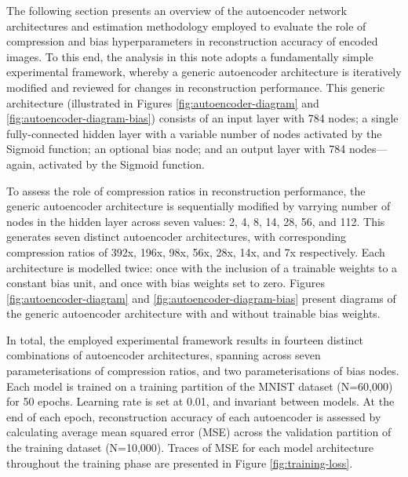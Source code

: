 
The following section presents an overview of the autoencoder network architectures and estimation methodology employed to evaluate the role of compression and bias hyperparameters in reconstruction accuracy of encoded images. 
To this end, the analysis in this note adopts a fundamentally simple experimental framework, whereby a generic autoencoder architecture is iteratively modified and reviewed for changes in reconstruction performance.
This generic architecture (illustrated in Figures \ref{fig:autoencoder-diagram} and \ref{fig:autoencoder-diagram-bias}) consists of an input layer with 784 nodes; a single fully-connected hidden layer with a variable number of nodes activated by the Sigmoid function; an optional bias node; and an output layer with 784 nodes---again, activated by the Sigmoid function.

To assess the role of compression ratios in reconstruction performance, the generic autoencoder architecture is sequentially modified by varrying number of nodes in the hidden layer across seven values: 2, 4, 8, 14, 28, 56, and 112.
This generates seven distinct autoencoder architectures, with corresponding compression ratios of 392x, 196x, 98x, 56x, 28x, 14x, and 7x respectively.
Each architecture is modelled twice: once with the inclusion of a trainable weights to a constant bias unit, and once with bias weights set to zero.
Figures \ref{fig:autoencoder-diagram} and \ref{fig:autoencoder-diagram-bias} present diagrams of the generic autoencoder architecture with and without trainable bias weights. 

In total, the employed experimental framework results in fourteen distinct combinations of autoencoder architectures, spanning across seven parameterisations of compression ratios, and two parameterisations of bias nodes. 
Each model is trained on a training partition of the MNIST dataset (N=60,000) for 50 epochs.
Learning rate is set at 0.01, and invariant between models.
At the end of each epoch, reconstruction accuracy of each autoencoder is assessed by calculating average mean squared error (MSE) across the validation partition of the training dataset (N=10,000).
Traces of MSE for each model architecture throughout the training phase are presented in Figure \ref{fig:training-loss}.


